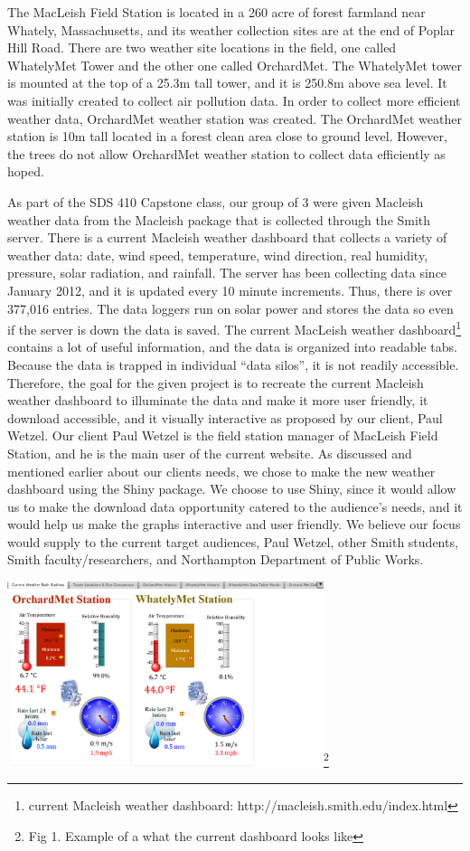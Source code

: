 \documentclass[10pt,letterpaper]{article}
\begin{document}
The MacLeish Field Station is located in a 260 acre of forest farmland
near Whately, Massachusetts, and its weather collection sites are at the
end of Poplar Hill Road. There are two weather site locations in the
field, one called WhatelyMet Tower and the other one called OrchardMet.
The WhatelyMet tower is mounted at the top of a 25.3m tall tower, and it
is 250.8m above sea level. It was initially created to collect air
pollution data. In order to collect more efficient weather data,
OrchardMet weather station was created. The OrchardMet weather station
is 10m tall located in a forest clean area close to ground level.
However, the trees do not allow OrchardMet weather station to collect
data efficiently as hoped.

As part of the SDS 410 Capstone class, our group of 3 were given
Macleish weather data from the Macleish package that is collected
through the Smith server. There is a current Macleish weather dashboard
that collects a variety of weather data: date, wind speed, temperature,
wind direction, real humidity, pressure, solar radiation, and rainfall.
The server has been collecting data since January 2012, and it is
updated every 10 minute increments. Thus, there is over 377,016 entries.
The data loggers run on solar power and stores the data so even if the
server is down the data is saved. The current MacLeish weather
dashboard\footnote{current Macleish weather dashboard:
  http://macleish.smith.edu/index.html} contains a lot of useful
information, and the data is organized into readable tabs. Because the
data is trapped in individual ``data silos'', it is not readily
accessible. Therefore, the goal for the given project is to recreate the
current Macleish weather dashboard to illuminate the data and make it
more user friendly, it download accessible, and it visually interactive
as proposed by our client, Paul Wetzel. Our client Paul Wetzel is the
field station manager of MacLeish Field Station, and he is the main user
of the current website. As discussed and mentioned earlier about our
clients needs, we chose to make the new weather dashboard using the
Shiny package. We choose to use Shiny, since it would allow us to make
the download data opportunity catered to the audience's needs, and it
would help us make the graphs interactive and user friendly. We believe
our focus would supply to the current target audiences, Paul Wetzel,
other Smith students, Smith faculty/researchers, and Northampton
Department of Public Works.

\includegraphics[width=3.64583in]{current.PNG}\footnote{Fig 1. Example
  of a what the current dashboard looks like}
\end{document}
